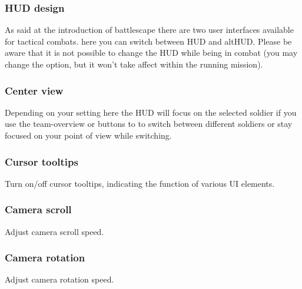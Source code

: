 \subsubsection*{HUD design}
As said at the introduction of battlescape there are two user interfaces available for tactical combats. here you can switch between HUD and altHUD. Please be aware that it is not possible to change the HUD while being in combat (you may change the option, but it won't take affect within the running mission).
\subsubsection*{Center view}
Depending on your setting here the HUD will focus on the selected soldier if you use the team-overview or buttons  to  to switch between different soldiers or stay focused on your point of view while switching.
\subsubsection*{Cursor tooltips}
Turn on/off cursor tooltips, indicating the function of various UI elements.
\subsubsection*{Camera scroll}
Adjust camera scroll speed.
\subsubsection*{Camera rotation}
Adjust camera rotation speed.
